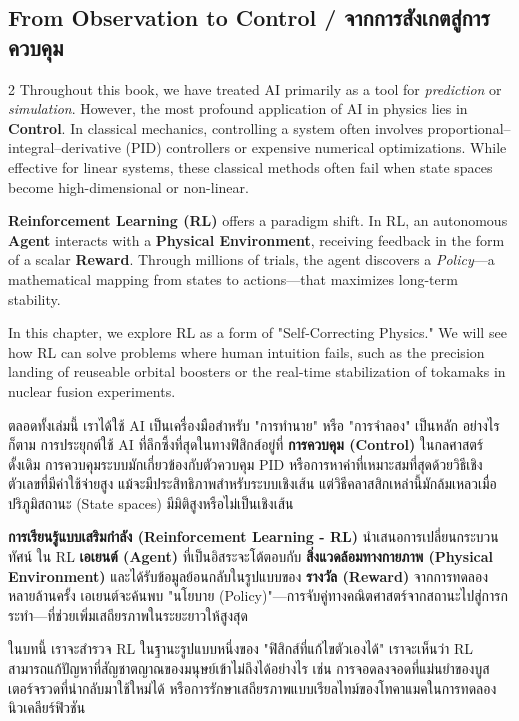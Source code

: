 \subsection{From Observation to Control \quad / \quad \textthai{จากการสังเกตสู่การควบคุม}}
\begin{paracol}{2}
Throughout this book, we have treated AI primarily as a tool for \textit{prediction} or \textit{simulation}. However, the most profound application of AI in physics lies in \textbf{Control}. In classical mechanics, controlling a system often involves proportional–integral–derivative (PID) controllers or expensive numerical optimizations. While effective for linear systems, these classical methods often fail when state spaces become high-dimensional or non-linear.

\textbf{Reinforcement Learning (RL)} offers a paradigm shift. In RL, an autonomous \textbf{Agent} interacts with a \textbf{Physical Environment}, receiving feedback in the form of a scalar \textbf{Reward}. Through millions of trials, the agent discovers a \textit{Policy}—a mathematical mapping from states to actions—that maximizes long-term stability.

In this chapter, we explore RL as a form of "Self-Correcting Physics." We will see how RL can solve problems where human intuition fails, such as the precision landing of reuseable orbital boosters or the real-time stabilization of tokamaks in nuclear fusion experiments.

\switchcolumn

\begin{thai}
ตลอดทั้งเล่มนี้ เราได้ใช้ AI เป็นเครื่องมือสำหรับ "การทำนาย" หรือ "การจำลอง" เป็นหลัก อย่างไรก็ตาม การประยุกต์ใช้ AI ที่ลึกซึ้งที่สุดในทางฟิสิกส์อยู่ที่ \textbf{การควบคุม (Control)} ในกลศาสตร์ดั้งเดิม การควบคุมระบบมักเกี่ยวข้องกับตัวควบคุม PID หรือการหาค่าที่เหมาะสมที่สุดด้วยวิธีเชิงตัวเลขที่มีค่าใช้จ่ายสูง แม้จะมีประสิทธิภาพสำหรับระบบเชิงเส้น แต่วิธีคลาสสิกเหล่านี้มักล้มเหลวเมื่อปริภูมิสถานะ (State spaces) มีมิติสูงหรือไม่เป็นเชิงเส้น

\textbf{การเรียนรู้แบบเสริมกำลัง (Reinforcement Learning - RL)} นำเสนอการเปลี่ยนกระบวนทัศน์ ใน RL \textbf{เอเยนต์ (Agent)} ที่เป็นอิสระจะโต้ตอบกับ \textbf{สิ่งแวดล้อมทางกายภาพ (Physical Environment)} และได้รับข้อมูลย้อนกลับในรูปแบบของ \textbf{รางวัล (Reward)} จากการทดลองหลายล้านครั้ง เอเยนต์จะค้นพบ "นโยบาย (Policy)"—การจับคู่ทางคณิตศาสตร์จากสถานะไปสู่การกระทำ—ที่ช่วยเพิ่มเสถียรภาพในระยะยาวให้สูงสุด

ในบทนี้ เราจะสำรวจ RL ในฐานะรูปแบบหนึ่งของ "ฟิสิกส์ที่แก้ไขตัวเองได้" เราจะเห็นว่า RL สามารถแก้ปัญหาที่สัญชาตญาณของมนุษย์เข้าไม่ถึงได้อย่างไร เช่น การจอดลงจอดที่แม่นยำของบูสเตอร์จรวดที่นำกลับมาใช้ใหม่ได้ หรือการรักษาเสถียรภาพแบบเรียลไทม์ของโทคาแมคในการทดลองนิวเคลียร์ฟิวชัน
\end{thai}
\end{paracol}

